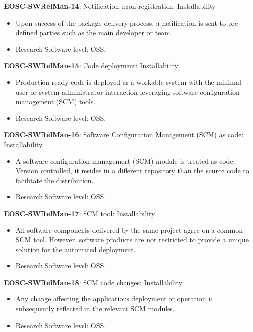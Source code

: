 \textbf{EOSC-SWRelMan-14}: Notification upon registration: Installability

\begin{itemize}
    \item Upon success of the package delivery process, a notification is sent to pre-defined parties such as the main developer or team. \cite{orviz_set_2017}
    \item Research Software level: OSS.
\end{itemize}

\textbf{EOSC-SWRelMan-15}: Code deployment: Installability

\begin{itemize}
    \item Production-ready code is deployed as a workable system with the minimal user or system administrator interaction leveraging software configuration management (SCM) tools. \cite{orviz_set_2017}
    \item Research Software level: OSS.
\end{itemize}

\textbf{EOSC-SWRelMan-16}: Software Configuration Management (SCM) as code: Installability

\begin{itemize}
    \item A software configuration management (SCM) module is treated as code. Version controlled, it resides in a different repository than the source code to facilitate the distribution. \cite{orviz_set_2017}
    \item Research Software level: OSS.
\end{itemize}

\textbf{EOSC-SWRelMan-17}: SCM tool: Installability

\begin{itemize}
    \item All software components delivered by the same project agree on a common SCM tool. However, software products are not restricted to provide a unique solution for the automated deployment. \cite{orviz_set_2017}
    \item Research Software level: OSS.
\end{itemize}

\textbf{EOSC-SWRelMan-18}: SCM code changes: Installability

\begin{itemize}
    \item Any change affecting the applications deployment or operation is subsequently reflected in the relevant SCM modules. \cite{orviz_set_2017}
    \item Research Software level: OSS.
\end{itemize}

